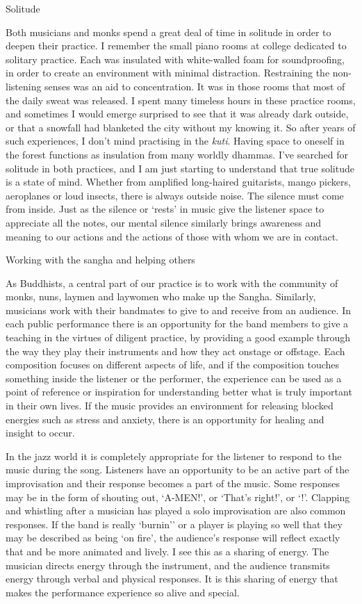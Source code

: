 Solitude

Both musicians and monks spend a great deal of time in solitude in order
to deepen their practice. I remember the small piano rooms at college
dedicated to solitary practice. Each was insulated with white-walled
foam for soundproofing, in order to create an environment with minimal
distraction. Restraining the non-listening senses was an aid to
concentration. It was in those rooms that most of the daily sweat was
released. I spent many timeless hours in these practice rooms, and
sometimes I would emerge surprised to see that it was already dark
outside, or that a snowfall had blanketed the city without my knowing
it. So after years of such experiences, I don't mind practising in the
\emph{kuti}. Having space to oneself in the forest functions as
insulation from many worldly dhammas. I've searched for solitude in both
practices, and I am just starting to understand that true solitude is a
state of mind. Whether from amplified long-haired guitarists, mango
pickers, aeroplanes or loud insects, there is always outside noise. The
silence must come from inside. Just as the silence or `rests' in music
give the listener space to appreciate all the notes, our mental silence
similarly brings awareness and meaning to our actions and the actions of
those with whom we are in contact.

Working with the sangha and helping others

As Buddhists, a central part of our practice is to work with the
community of monks, nuns, laymen and laywomen who make up the Sangha.
Similarly, musicians work with their bandmates to give to and receive
from an audience. In each public performance there is an opportunity for
the band members to give a teaching in the virtues of diligent practice,
by providing a good example through the way they play their instruments
and how they act onstage or offstage. Each composition focuses on
different aspects of life, and if the composition touches something
inside the listener or the performer, the experience can be used as a
point of reference or inspiration for understanding better what is truly
important in their own lives. If the music provides an environment for
releasing blocked energies such as stress and anxiety, there is an
opportunity for healing and insight to occur.

In the jazz world it is completely appropriate for the listener to
respond to the music during the song. Listeners have an opportunity to
be an active part of the improvisation and their response becomes a part
of the music. Some responses may be in the form of shouting out,
`A-MEN!', or `That's right!', or `!'. Clapping and whistling after a
musician has played a solo improvisation are also common responses. If
the band is really `burnin'' or a player is playing so well that they
may be described as being `on fire', the audience's response will
reflect exactly that and be more animated and lively. I see this as a
sharing of energy. The musician directs energy through the instrument,
and the audience transmits energy through verbal and physical responses.
It is this sharing of energy that makes the performance experience so
alive and special.

